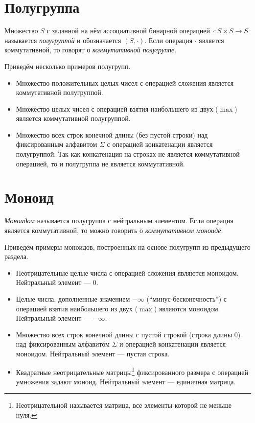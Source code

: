 \section{Полугруппа}


\begin{definition}
Множество $S$ с заданной на нём ассоциативной бинарной операцией $\cdot : S \times S \to S$ называется \emph{полугруппой} и обозначается $(S, \cdot)$.
Если операция $\cdot$ является коммутативной, то говорят о \textit{коммутативной полугруппе}.
\end{definition}


\begin{example} Приведём несколько примеров полугрупп.
\begin{itemize}
	\item Множество положительных целых чисел с операцией сложения является коммутативной полугруппой.
	\item Множество целых чисел с операцией взятия наибольшего из двух ($\max$) является коммутативной полугруппой.
	\item Множество всех строк конечной длины (без пустой строки) над фиксированным алфавитом $\Sigma$ с операцией конкатенации является полугруппой. Так как конкатенация на строках не является коммутативной операцией, то и полугруппа не является коммутативной.
\end{itemize}
\end{example}


\section{Моноид}


\begin{definition}
	\emph{Моноидом} называется полугруппа с нейтральным элементом. Если операция является коммутативной, то можно говорить о \emph{коммутативном моноиде}.
\end{definition}

\begin{example} Приведём примеры моноидов, построенных на основе полугрупп из предыдущего раздела.

\begin{itemize}
	\item Неотрицательные целые числа с операцией сложения являются моноидом. Нейтральный элемент --- $0$.
	\item Целые числа, дополненные значением $-\infty$ (``минус-бесконечность'') с операцией взятия наибольшего из двух ($\max$) являются моноидом. Нейтральный элемент --- $-\infty$.
	\item Множество всех строк конечной длины с пустой строкой (строка длины 0) над фиксированным алфавитом $\Sigma$ и операцией конкатенации является моноидом. Нейтральный элемент --- пустая строка.
	\item Квадратные неотрицательные матрицы\footnote{Неотрицательной называется матрица, все элементы которой не меньше нуля.} фиксированного размера с операцией умножения задают моноид. Нейтральный элемент --- единичная матрица.
\end{itemize}
\end{example}


